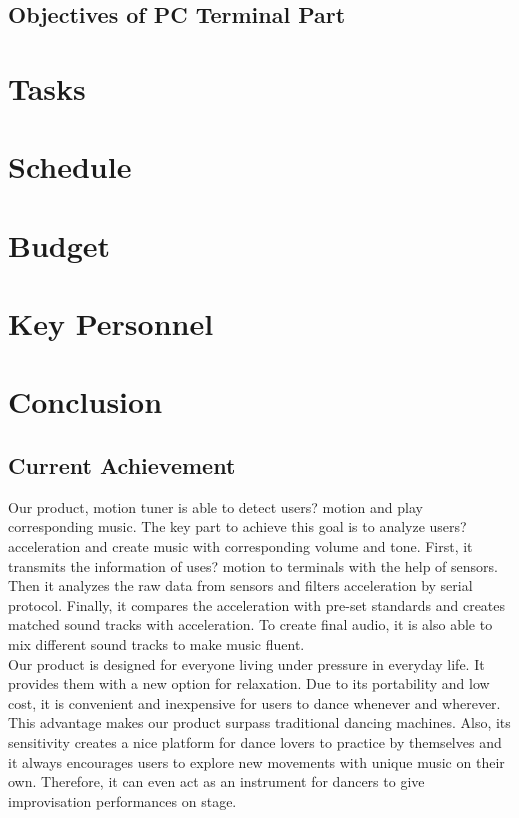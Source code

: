 \documentclass{article}
\begin{document}
\subsection{Objectives of PC Terminal Part}

\section{Tasks}

\section{Schedule}

\section{Budget}


\section{Key Personnel}

\newpage
\section{Conclusion}
\subsection{Current Achievement}
\hspace*{2em}Our product, motion tuner is able to detect users? motion and play corresponding music. The key part to achieve this goal is to analyze users? acceleration and create music with corresponding volume and tone. First, it transmits the information of uses? motion to terminals with the help of sensors. Then it analyzes the raw data from sensors and filters acceleration by serial protocol. Finally, it compares the acceleration with pre-set standards and creates matched sound tracks with acceleration. To create final audio, it is also able to mix different sound tracks to make music fluent. \\
\hspace*{2em}Our product is designed for everyone living under pressure in everyday life. It provides them with a new option for relaxation. Due to its portability and low cost, it is convenient and inexpensive for users to dance whenever and wherever. This advantage makes our product surpass traditional dancing machines. Also, its sensitivity creates a nice platform for dance lovers to practice by themselves and it always encourages users to explore new movements with unique music on their own. Therefore, it can even act as an instrument for dancers to give improvisation performances on stage.
\end{document}
